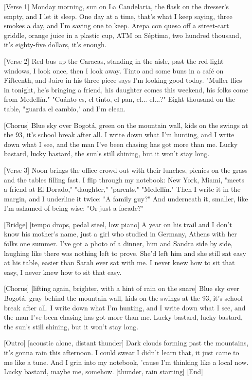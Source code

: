 \begin{lyrics}

[Verse 1]
Monday morning, sun on La Candelaria,
the flask on the dresser's empty, and I let it sleep.
One day at a time, that's what I keep saying,
three smokes a day, and I'm saving one to keep.
Arepa con queso off a street-cart griddle,
orange juice in a plastic cup,
ATM on Séptima, two hundred thousand,
it's eighty-five dollars, it's enough.

[Verse 2]
Red bus up the Caracas, standing in the aisle,
past the red-light windows, I look once, then I look away.
Tinto and some buns in a café on Fifteenth,
and Jairo in his three-piece says I'm looking good today.
"Muller flies in tonight, he's bringing a friend,
his daughter comes this weekend, his folks come from Medellín."
"Cuánto es, el tinto, el pan, el... el...?"
Eight thousand on the table, "guarda el cambio," and I'm clean.

[Chorus]
Blue sky over Bogotá, green on the mountain wall,
kids on the swings at the 93, it's school break after all.
I write down what I'm hunting, and I write down what I see,
and the man I've been chasing has got more than me.
Lucky bastard,
lucky bastard,
the sun's still shining, but it won't stay long.

[Verse 3]
Noon brings the office crowd out with their lunches,
picnics on the grass and the tables filling fast.
I flip through my notebook: New York, Miami,
"meets a friend at El Dorado," "daughter," "parents," "Medellín."
Then I write it in the margin, and I underline it twice:
"A family guy?"
And underneath it, smaller, like I'm ashamed of being wise:
"Or just a facade?"

[Bridge]
[tempo drops, pedal steel, low piano]
A year on his trail and I don't know his mother's name,
just a girl who studied in Germany, Athens with her folks one summer.
I've got a photo of a dinner, him and Sandra side by side,
laughing like there was nothing left to prove.
She'd left him and she still sat easy at his table,
easier than Sarah ever sat with me.
I never knew how to sit that easy,
I never knew how to sit that easy.

[Chorus]
[lifting again, brighter, with a hint of rain on the snare]
Blue sky over Bogotá, gray behind the mountain wall,
kids on the swings at the 93, it's school break after all.
I write down what I'm hunting, and I write down what I see,
and the man I've been chasing has got more than me.
Lucky bastard,
lucky bastard,
the sun's still shining, but it won't stay long.

[Outro]
[acoustic alone, distant thunder]
Dark clouds forming past the mountains,
it's gonna rain this afternoon.
I could swear I didn't learn that,
it just came to me like a tune.
And I grin into my notebook,
'cause I'm thinking like a local now.
Lucky bastard,
maybe me, somehow.
[thunder, rain starting]
[End]
\end{lyrics}

